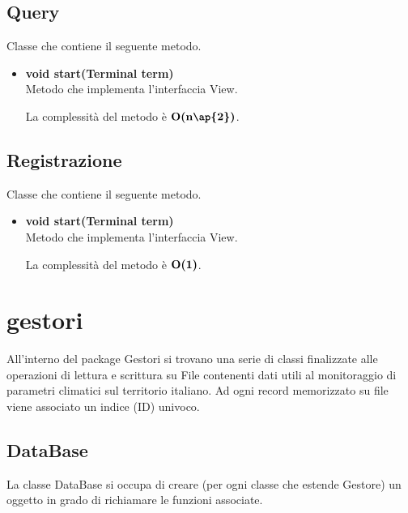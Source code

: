 \documentclass[a4paper, 12pt]{scrreprt}
\begin{document}
			\subsection{Query}
			Classe che contiene il seguente metodo.
			\begin{itemize}
				\item \textbf{void start(Terminal term)}
				\\Metodo che implementa l'interfaccia View.
				
				La complessit\`a del metodo \`e $\bigO\textbf{(n\ap{2})}$.
				
			\end{itemize}
			\subsection{Registrazione}
			Classe che contiene il seguente metodo.
			\begin{itemize}
				\item \textbf{void start(Terminal term)}
				\\Metodo che implementa l'interfaccia View.
				
				La complessit\`a del metodo \`e $\mathbf{O}\textbf{(1)}$.
				
			\end{itemize}
			
		\section{gestori}
		All'interno del package Gestori si trovano una serie di classi finalizzate alle operazioni di lettura e scrittura su File contenenti dati utili al monitoraggio di parametri climatici sul territorio italiano.
		Ad ogni record memorizzato su file viene associato un indice (ID) univoco.
			\subsection{DataBase}
			La classe DataBase si occupa di creare (per ogni classe che estende Gestore) un oggetto in grado di richiamare le funzioni associate.
\end{document}
